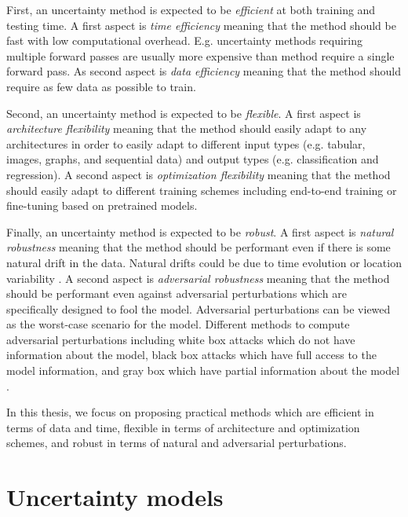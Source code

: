 First, an uncertainty method is expected to be \emph{efficient} at both training and testing time. 
A first aspect is \emph{time efficiency} meaning that the method should be fast with low computational overhead. E.g. uncertainty methods requiring multiple forward passes are usually more expensive than method require a single forward pass.
As second aspect is \emph{data efficiency} meaning that the method should require as few data as possible to train.

Second, an uncertainty method is expected to be \emph{flexible}.
A first aspect is \emph{architecture flexibility} meaning that the method should easily adapt to any architectures in order to easily adapt to different input types (e.g. tabular, images, graphs, and sequential data) and output types (e.g. classification and regression).
A second aspect is \emph{optimization flexibility} meaning that the method should easily adapt to different training schemes including end-to-end training or fine-tuning based on pretrained models.

Finally, an uncertainty method is expected to be \emph{robust}.
A first aspect is \emph{natural robustness} meaning that the method should be performant even if there is some natural drift in the data. Natural drifts could be due to time evolution or location variability \cite{wilds, neuhold201mapillary, shifts-dataset}.
A second aspect is \emph{adversarial robustness} meaning that the method should be performant even against adversarial perturbations which are specifically designed to fool the model. Adversarial perturbations can be viewed as the worst-case scenario for the model. Different methods to compute adversarial perturbations including white box attacks which do not have information about the model, black box attacks which have full access to the model information, and gray box which have partial information about the model \cite{han2020adversarial}.

In this thesis, we focus on proposing practical methods which are efficient in terms of data and time, flexible in terms of architecture and optimization schemes, and robust in terms of natural and adversarial perturbations.

\section{Uncertainty models}
\label{sec:background-models}

